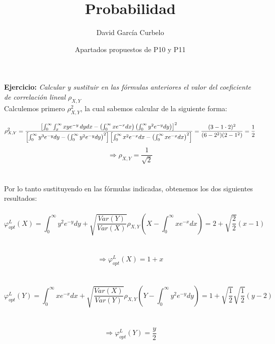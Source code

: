\documentclass[fleqn]{article}
\author{David García Curbelo}
\title{Probabilidad}
\date{Apartados propuestos de P10 y P11}
\begin{document}
    \maketitle
    \setcounter{page}{1}
    \pagestyle{plain}

    \textbf{Ejercicio: } \textit{Calcular y sustituir en las fórmulas anteriores el valor del coeficiente de correlación lineal $\rho_{X,Y}$} \\ 

    Calculemos primero $\rho^2_{X,Y}$, la cual sabemos calcular de la siguiente forma:

    $$\rho_{X,Y}^2 = \frac{ 
            \left[ \int_0^{\infty} \int_x^{\infty} xye^{-y} \thinspace dydx - \left( \int_0^{\infty} xe^{-x}dx \right) \left( \int_0^{\infty} y^2e^{-y}dy \right) \right]^2
        }
        {
            \left[ \int_0^{\infty} y^3e^{-y}dy - \left( \int_0^{\infty} y^2e^{-y}dy \right)^2 \right] \left[ \int_0^{\infty} x^2e^{-x}dx - \left( \int_0^{\infty} xe^{-x}dx \right)^2 \right]
        }
    = \frac{(3- 1\cdot 2)^2}{(6-2^2)(2-1^2)} = \frac{1}{2}
    $$
    $$ \Rightarrow \rho_{X,Y} = \frac{1}{\sqrt{2}} $$ \\ \\

    Por lo tanto sustituyendo en las fórmulas indicadas, obtenemos los dos siguientes resultados:\\ \\

    $$\varphi_{opt}^L (X) = \int_0^{\infty} y^2e^{-y}dy + \sqrt{\frac{Var(Y)}{Var(X)}} \rho_{X,Y} \left(X - \int_0^{\infty} xe^{-x}dx\right) = 2 + \sqrt{\frac{2}{2}} (x-1)$$ \\ \\
    $$ \Rightarrow \varphi_{opt}^L (X) = 1 + x$$\\ \\

    $$\varphi_{opt}^L (Y) = \int_0^{\infty} xe^{-x}dx + \sqrt{\frac{Var(X)}{Var(Y)}} \rho_{X,Y} \left(Y - \int_0^{\infty} y^2e^{-y}dy \right) = 1 + \sqrt{\frac{1}{2}} \sqrt{\frac{1}{2}} (y-2)$$ \\ \\
    $$ \Rightarrow \varphi_{opt}^L (Y) = \frac{y}{2}$$
\end{document}
